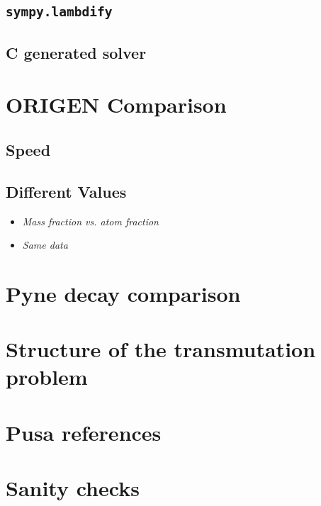 \documentclass{article}
\begin{document}
\subsection{\texttt{sympy.lambdify}}
\label{sec:lambdify-solve}


\subsection{C generated solver}
\label{sec:c-solve}


\section{ORIGEN Comparison}
\subsection{Speed}
\subsection{Different Values}
\begin{itemize}
\item \it{Mass fraction vs. atom fraction}
\item \it{Same data}
\end{itemize}

\section{Pyne decay comparison}

\section{Structure of the transmutation problem}

\section{Pusa references}

\section{Sanity checks}


\end{document}
